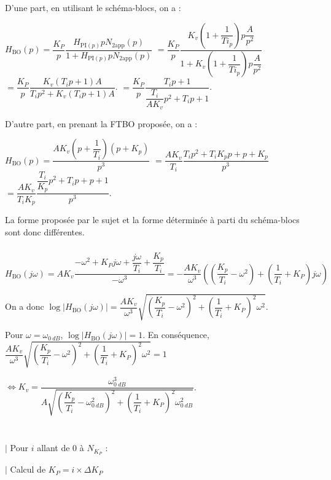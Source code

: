 \documentclass[10pt,fleqn]{article} %
\begin{document}
\begin{rem} D'une part, en utilisant le schéma-blocs, on a :

$H_{\text{BO}}(p)=\dfrac{K_P}{p}\dfrac{H_{\text{PI}(p)}pN_{\text{2app}}(p)}{1+H_{\text{PI}(p)}pN_{\text{2app}}(p)}$
$=\dfrac{K_P}{p}\dfrac{K_v\left(1+\dfrac{1}{Ti_ p} \right)p\dfrac{A}{p^2}}{1+K_v\left(1+\dfrac{1}{Ti_ p} \right)p\dfrac{A}{p^2}}$
$=\dfrac{K_P}{p}\dfrac{K_v\left(T_i p+1 \right){A}}{T_i p^2+K_v\left(T_i p+1 \right){A}}$.
$=\dfrac{K_P}{p}\dfrac{T_i p+1}{\dfrac{T_i}{AK_v} p^2+ T_i p+1 }$.

D'autre part, en prenant la FTBO proposée, on a : 

$H_{\text{BO}}(p)=\dfrac{AK_v\left(p+\dfrac{1}{T_i} \right)\left(p+K_p\right)}{p^3}$
$=\dfrac{AK_v}{T_i}\dfrac{T_ip^2+T_iK_pp+p+K_p }{p^3}$
$=\dfrac{AK_v}{T_iK_p}\dfrac{\dfrac{T_i}{K_p}p^2+T_ip+p+1 }{p^3}$.

La forme proposée par le sujet et la forme déterminée à parti du schéma-blocs sont donc différentes. 

\end{rem}

\subparagraph{} %

$H_{\text{BO}}(j\omega)=AK_v\dfrac{-\omega^2 + K_Pj\omega + \dfrac{j\omega}{T_i}+\dfrac{K_p}{T_i }}{-\omega^3}
=-\dfrac{AK_v}{\omega^3}  \left(\left(\dfrac{K_p}{T_i }-\omega^2 \right)+\left(\dfrac{1}{T_i}+ K_P\right)j\omega \right)$

On a donc 
$\log\left|H_{\text{BO}}(j\omega)\right|=\dfrac{AK_v}{\omega^3}  \sqrt{\left(\dfrac{K_p}{T_i }-\omega^2 \right)^2+\left(\dfrac{1}{T_i}+ K_P\right)^2\omega^2}$. 

Pour $\omega=\omega_{\SI{0}{dB}}$, $\log\left|H_{\text{BO}}(j\omega)\right|=1$. En conséquence, 
$\dfrac{AK_v}{\omega^3}  \sqrt{\left(\dfrac{K_p}{T_i }-\omega^2 \right)^2+\left(\dfrac{1}{T_i}+ K_P\right)^2\omega^2}=1 $

$\Leftrightarrow 
K_v  =\dfrac{\omega_{\SI{0}{dB}}^3}{A\sqrt{\left(\dfrac{K_p}{T_i }-\omega_{\SI{0}{dB}}^2 \right)^2+\left(\dfrac{1}{T_i}+ K_P\right)^2\omega_{\SI{0}{dB}}^2}}$.


\subparagraph{} %
~\\

\noindent \hspace{.4cm} $|$ Pour $i$ allant de 0 à $N_{K_P}$ :  

\noindent \hspace{.8cm} $|$ Calcul de $K_P=i\times \Delta K_P$ 
\end{document}

